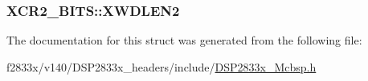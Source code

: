 \subsubsection[{X\+W\+D\+L\+E\+N2}]{ X\+C\+R2\+\_\+\+B\+I\+T\+S\+::\+X\+W\+D\+L\+E\+N2}\label{struct_x_c_r2___b_i_t_s_a82628dce351282470a0b25242de91783}


The documentation for this struct was generated from the following file\+:\begin{DoxyCompactItemize}
\item 
f2833x/v140/\+D\+S\+P2833x\+\_\+headers/include/\hyperlink{_d_s_p2833x___mcbsp_8h}{D\+S\+P2833x\+\_\+\+Mcbsp.\+h}\end{DoxyCompactItemize}
